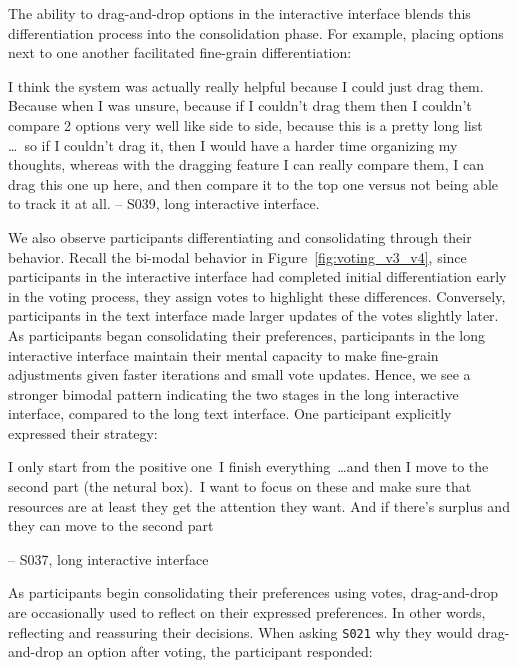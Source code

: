 The ability to drag-and-drop options in the interactive interface blends this differentiation process into the consolidation phase. For example, placing options next to one another facilitated fine-grain differentiation:

\begin{displayquote}
    I think the system was actually really helpful because I could just drag them. \bracketellipsis Because when I was unsure, because if I couldn't drag them then I couldn't compare 2 options very well like side to side, because this is a pretty long list \ldots\ so if I couldn't drag it, then I would have a harder time organizing my thoughts, whereas with the dragging feature I can really compare them, I can drag this one up here, and then compare it to the top one versus not being able to track it at all.
    \noindent \hfill -- S039, long interactive interface.
\end{displayquote}

We also observe participants differentiating and consolidating through their behavior. Recall the bi-modal behavior in Figure~\ref{fig:voting_v3_v4}, since participants in the interactive interface had completed initial differentiation early in the voting process, they assign votes to highlight these differences. Conversely, participants in the text interface made larger updates of the votes slightly later. As participants began consolidating their preferences, participants in the long interactive interface maintain their mental capacity to make fine-grain adjustments given faster iterations and small vote updates. Hence, we see a stronger bimodal pattern indicating the two stages in the long interactive interface, compared to the long text interface. One participant explicitly expressed their strategy:

\begin{displayquote}
    I only start from the positive one~\bracketellipsis I finish everything~\ldots and then I move to the second part (the netural box).~\bracketellipsis I want to focus on these and make sure that resources are at least they get the attention they want. And if there's surplus and they can move to the second part
    
    \noindent \hfill -- S037, long interactive interface
\end{displayquote}

As participants begin consolidating their preferences using votes, drag-and-drop are occasionally used to reflect on their expressed preferences. In other words, reflecting and reassuring their decisions. When asking \texttt{S021} why they would drag-and-drop an option after voting, the participant responded:

